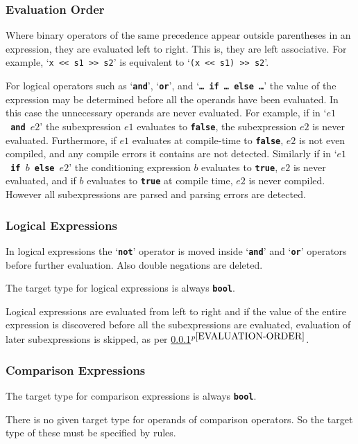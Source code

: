 \documentclass[12pt]{article}
\newcommand{\TT}[1]{{\tt \bfseries #1}}
\newcommand{\itemref}[1]{\ref{#1}$^{p\pageref{#1}}$}
\begin{document}
\subsubsection{Evaluation Order}
\label{EVALUATION-ORDER}

Where binary operators of the same precedence appear outside
parentheses in an expression, they are evaluated left to right.
This is, they are left associative.  For example,
`{\tt x <{}< s1 >{}> s2}' is
equivalent to `{\tt (x <{}< s1) >{}> s2}'.

For logical operators such as `\TT{and}', `\TT{or}', and
`\TT{\ldots{}~if~\ldots{}~else~\ldots{}}' the value of the expression
may be determined before all the operands have been evaluated.
In this case the unnecessary operands are never evaluated.
For example, if in `\TT{$e1$~and~$e2$}' the subexpression $e1$
evaluates to \TT{false}, the subexpression $e2$ is never evaluated.
Furthermore, if $e1$ evaluates at compile-time to \TT{false},
$e2$ is not even compiled, and any compile errors it contains
are not detected.  Similarly if in `\TT{$e1$~if~$b$~else~$e2$}' the
conditioning expression $b$ evaluates to \TT{true}, $e2$ is
never evaluated, and if $b$ evaluates to \TT{true} at compile
time, $e2$ is never compiled.  However all subexpressions are parsed and
parsing errors are detected.

\subsubsection{Logical Expressions}

In logical expressions the `\TT{not}' operator is moved inside
`\TT{and}' and `\TT{or}' operators before further evaluation.
Also double negations are deleted.

The target type for logical expressions is always \TT{bool}.

Logical expressions are evaluated from left to right and
if the value of the entire expression is discovered before all
the subexpressions are evaluated, evaluation of later subexpressions is
skipped, as per \itemref{EVALUATION-ORDER}.

\subsubsection{Comparison Expressions}
\label{COMPARISON-EXPRESSIONS}

The target type for comparison expressions is always \TT{bool}.

There is no given target type for operands of comparison operators.
So the target type of these must be specified by rules.
\end{document}
